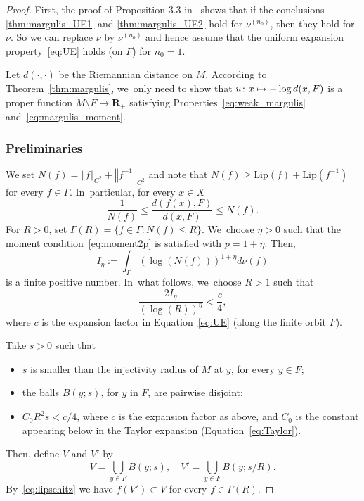 \documentclass[JEP,XML,SOM,Unicode,published]{cedram}
\newcommand\mto{\mathchoice{\longmapsto}{\mapsto}{\mapsto}{\mapsto}}
\let\sep :
\newcommand{\norm}[1]{{\left\Vert#1\right\Vert}}
\newcommand{\inv}{^{-1}}
\def\R{\mathbf{R}}
\newcommand\Lip{\mathrm{Lip}}
\theoremstyle{plain}
\theoremstyle{definition}
\begin{document}
\begin{proof}
First, the proof of Proposition 3.3 in~\cite{benard-desaxce} shows that if
the conclusions \eqref{thm:margulis_UE1} and \eqref{thm:margulis_UE2} hold for $\nu^{(n_0)}$, then they hold for $\nu$. So we can replace $\nu$ by $\nu^{(n_0)}$ and hence assume that the uniform expansion property~\eqref{eq:UE} holds (on $F$) for $n_0=1$.

Let $d(\cdot,\cdot)$ be the Riemannian distance on $M$. According to Theorem~\ref{thm:margulis}, we~only need to show that
$u\colon x\mto - \log d(x, F)$ is a
proper function $M\setminus F\to \R_+$ satisfying Properties~\eqref{eq:weak_margulis}
and~\eqref{eq:margulis_moment}.

\subsubsection*{Preliminaries}
We set
$N(f)=\norm{f}_{C^2}+\norm{f\inv}_{C^2}$ and note that $N(f)\geq \Lip(f) + \Lip(f\inv)$ for every $f\in \Gamma$. In~particular, for every $x\in X$
\begin{equation}
\label{eq:lipschitz}
\frac{1}{N(f)} \leq \frac{d (f(x), F)}{d(x,F)} \leq N(f).
\end{equation}
For $R>0$, set $\Gamma(R)=\{f\in \Gamma \sep  N(f) \leq R\}$. We~choose $\eta >0$ such that the moment condition~\eqref{eq:moment2p} is satisfied with $p=1+\eta$. Then,
\begin{equation*}
I_\eta:=\int_{\Gamma} \left(\log(N(f))\right)^{1+\eta} d\nu(f)
\end{equation*}
is a finite positive number. In~what follows, we~choose $R>1$ such that
\begin{equation*}
\frac{2I_\eta}{(\log(R))^\eta}< \frac{c}{4},
\end{equation*}
where $c$ is the expansion factor in Equation~\eqref{eq:UE} (along the finite orbit $F$).

Take $s>0$ such that
\begin{itemize}
\item $s$ is smaller than the injectivity radius of $M$ at $y$, for every $y\in F$;
\item the balls $B(y;s)$, for $y$ in $F$, are pairwise disjoint;
\item $C_0R^2 s < c/4$, where $c$ is the expansion factor as above, and $C_0$ is the constant appearing
below in the Taylor expansion (Equation~\eqref{eq:Taylor}).
\end{itemize}
Then, define $V$ and $V'$ by
\begin{equation*}
V=\bigcup_{y\in F} B(y;s), \quad V' = \bigcup_{y\in F} B(y;s/R).
\end{equation*}
By~\eqref{eq:lipschitz} we have $f(V')\subset V$ for every $f\in \Gamma(R)$.


\end{proof}
\end{document}
